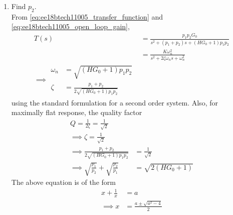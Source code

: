 \begin{enumerate}[label=\arabic*.,ref=\theenumi]
\item Find $p_2$.
\\
\solution From \eqref{eq:ee18btech11005_transfer_function} and \eqref{eq:ee18btech11005_open_loop_gain},
\begin{align}
    T(s) &= \frac{p_1p_2G_0}{s^2+(p_1+p_2)s+(HG_0+1)p_1p_2} \label{eq:ee18btech11005_closed_loop}
\\
&= \frac{K \omega_n^{2}}{s^2+2\zeta\omega_ns+\omega_n^{2}}
\\
\implies 
\begin{split}
    \omega_n &= \sqrt{(HG_0+1)p_1p_2}\\
    \zeta &= \frac{p_1+p_2}{2\sqrt{(HG_0+1)p_1p_2}}
\end{split}
\label{eq:ee18btech11005_second_order_zeta}
\end{align}
using the standard formulation for a second order system.  Also, for maximally flat response, the quality factor 
\begin{align}
    Q = \frac{1}{2\zeta}= \frac{1}{\sqrt{2}}&
\\
\implies  \zeta = \frac{1}{\sqrt{2}} &
\label{eq:ee18btech11005_second_order_zeta_q}
\\
\implies \frac{p_1+p_2}{2\sqrt{(HG_0+1)p_1p_2}} &= \frac{1}{\sqrt{2}}
\\
\implies \sqrt{\frac{p_1}{p_2}}+\sqrt{\frac{p_2}{p_1}} 
&= \sqrt{2(HG_0+1)} 
\end{align}
%
The above equation is of the form 
%
\begin{align}
\label{eq:ee18btech11005_x}
x + \frac{1}{x} &= a
\\
\implies x &= \frac{a \pm \sqrt{a^2 -4}}{2}

\end{align}
\end{enumerate}
